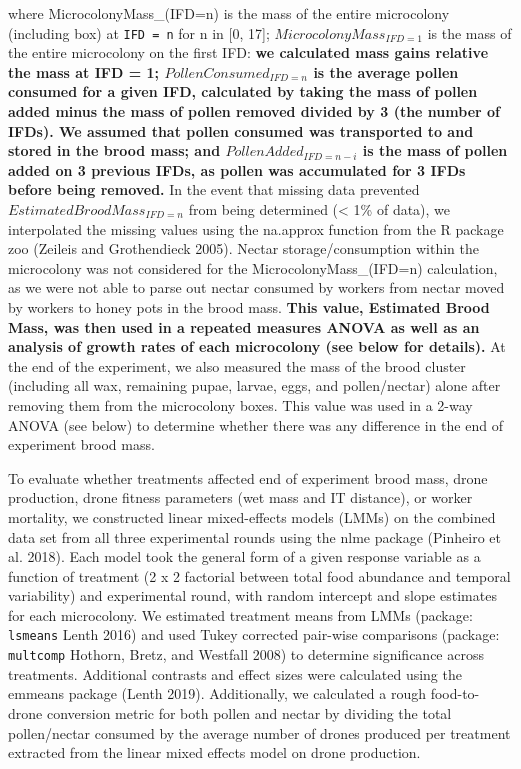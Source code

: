 \documentclass[11pt,]{article}
\begin{document}
where MicrocolonyMass\_(IFD=n) is the mass of the entire microcolony
(including box) at \texttt{IFD\ =\ n} for n in {[}0, 17{]};
\(MicrocolonyMass_{IFD=1}\) is the mass of the entire microcolony on the
first IFD: \textbf{we calculated mass gains relative the mass at IFD =
1; \(PollenConsumed_{IFD=n}\) is the average pollen consumed for a given
IFD, calculated by taking the mass of pollen added minus the mass of
pollen removed divided by 3 (the number of IFDs). We assumed that pollen
consumed was transported to and stored in the brood mass; and
\(PollenAdded_{IFD=n-i}\) is the mass of pollen added on 3 previous
IFDs, as pollen was accumulated for 3 IFDs before being removed.} In the
event that missing data prevented \(EstimatedBroodMass_{IFD=n}\) from
being determined (\textless{} 1\% of data), we interpolated the missing
values using the na.approx function from the R package zoo (Zeileis and
Grothendieck 2005). Nectar storage/consumption within the microcolony
was not considered for the MicrocolonyMass\_(IFD=n) calculation, as we
were not able to parse out nectar consumed by workers from nectar moved
by workers to honey pots in the brood mass. \textbf{This value,
Estimated Brood Mass, was then used in a repeated measures ANOVA as well
as an analysis of growth rates of each microcolony (see below for
details).} At the end of the experiment, we also measured the mass of
the brood cluster (including all wax, remaining pupae, larvae, eggs, and
pollen/nectar) alone after removing them from the microcolony boxes.
This value was used in a 2-way ANOVA (see below) to determine whether
there was any difference in the end of experiment brood mass.

To evaluate whether treatments affected end of experiment brood mass,
drone production, drone fitness parameters (wet mass and IT distance),
or worker mortality, we constructed linear mixed-effects models (LMMs)
on the combined data set from all three experimental rounds using the
nlme package (Pinheiro et al. 2018). Each model took the general form of
a given response variable as a function of treatment (2 x 2 factorial
between total food abundance and temporal variability) and experimental
round, with random intercept and slope estimates for each microcolony.
We estimated treatment means from LMMs (package: \texttt{lsmeans} Lenth
2016) and used Tukey corrected pair-wise comparisons (package:
\texttt{multcomp} Hothorn, Bretz, and Westfall 2008) to determine
significance across treatments. Additional contrasts and effect sizes
were calculated using the emmeans package (Lenth 2019). Additionally, we
calculated a rough food-to-drone conversion metric for both pollen and
nectar by dividing the total pollen/nectar consumed by the average
number of drones produced per treatment extracted from the linear mixed
effects model on drone production.
\end{document}
